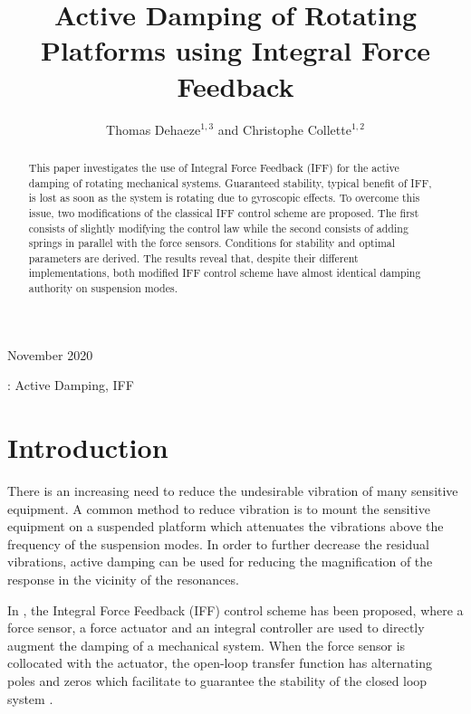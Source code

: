 \documentclass[10pt]{iopart}
\date{}
\begin{document}
\title{Active Damping of Rotating Platforms using Integral Force Feedback}
\author{Thomas Dehaeze$^{1,3}$ and Christophe Collette$^{1,2}$}
\address{$^1$ Precision Mechatronics Laboratory, University of Liege, Belgium}
\address{$^2$ BEAMS Department, Free University of Brussels, Belgium}
\address{$^3$ European Synchrotron Radiation Facility, Grenoble, France}

\vspace{10pt}
\begin{indented}
\item[]November 2020
\end{indented}

\begin{abstract}
This paper investigates the use of Integral Force Feedback (IFF) for the active damping of rotating mechanical systems.
Guaranteed stability, typical benefit of IFF, is lost as soon as the system is rotating due to gyroscopic effects.
To overcome this issue, two modifications of the classical IFF control scheme are proposed.
The first consists of slightly modifying the control law while the second consists of adding springs in parallel with the force sensors.
Conditions for stability and optimal parameters are derived.
The results reveal that, despite their different implementations, both modified IFF control scheme have almost identical damping authority on suspension modes.
\end{abstract}

\vspace{2pc}
: Active Damping, IFF

\ioptwocol

\section{Introduction}
\label{sec:orgcbd1527}
\label{sec:introduction}
There is an increasing need to reduce the undesirable vibration of many sensitive equipment.
A common method to reduce vibration is to mount the sensitive equipment on a suspended platform which attenuates the vibrations above the frequency of the suspension modes.
In order to further decrease the residual vibrations, active damping can be used for reducing the magnification of the response in the vicinity of the resonances.

In \cite{preumont92_activ_dampin_by_local_force}, the Integral Force Feedback (IFF) control scheme has been proposed, where a force sensor, a force actuator and an integral controller are used to directly augment the damping of a mechanical system.
When the force sensor is collocated with the actuator, the open-loop transfer function has alternating poles and zeros which facilitate to guarantee the stability of the closed loop system \cite{preumont02_force_feedb_versus_accel_feedb}.
\end{document}
